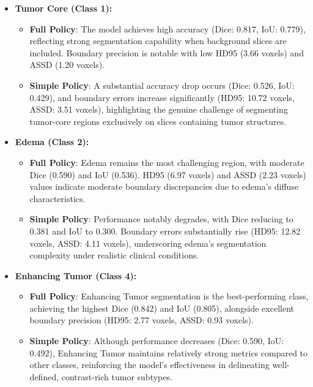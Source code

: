 \begin{itemize}
    \item \textbf{Tumor Core (Class 1):}
    \begin{itemize}
        \item \textbf{Full Policy}: The model achieves high accuracy (Dice: 0.817, IoU: 0.779), reflecting strong segmentation capability when background slices are included. Boundary precision is notable with low HD95 (3.66 voxels) and ASSD (1.20 voxels).
        \item \textbf{Simple Policy}: A substantial accuracy drop occurs (Dice: 0.526, IoU: 0.429), and boundary errors increase significantly (HD95: 10.72 voxels, ASSD: 3.51 voxels), highlighting the genuine challenge of segmenting tumor-core regions exclusively on slices containing tumor structures.
    \end{itemize}

    \item \textbf{Edema (Class 2):}
    \begin{itemize}
        \item \textbf{Full Policy}: Edema remains the most challenging region, with moderate Dice (0.590) and IoU (0.536). HD95 (6.97 voxels) and ASSD (2.23 voxels) values indicate moderate boundary discrepancies due to edema's diffuse characteristics.
        \item \textbf{Simple Policy}: Performance notably degrades, with Dice reducing to 0.381 and IoU to 0.300. Boundary errors substantially rise (HD95: 12.82 voxels, ASSD: 4.11 voxels), underscoring edema's segmentation complexity under realistic clinical conditions.
    \end{itemize}

    \item \textbf{Enhancing Tumor (Class 4):}
    \begin{itemize}
        \item \textbf{Full Policy}: Enhancing Tumor segmentation is the best-performing class, achieving the highest Dice (0.842) and IoU (0.805), alongside excellent boundary precision (HD95: 2.77 voxels, ASSD: 0.93 voxels).
        \item \textbf{Simple Policy}: Although performance decreases (Dice: 0.590, IoU: 0.492), Enhancing Tumor maintains relatively strong metrics compared to other classes, reinforcing the model's effectiveness in delineating well-defined, contrast-rich tumor subtypes.
    \end{itemize}
\end{itemize}


